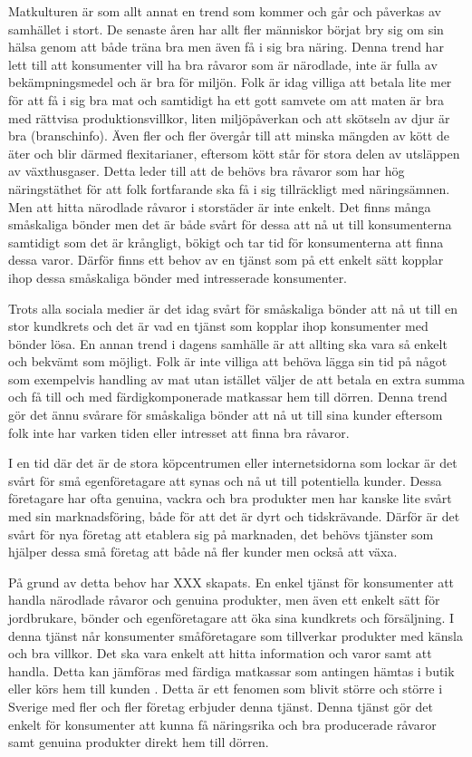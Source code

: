 \documentclass[10pt,a4paper,oneside]{article}
\begin{document}
Matkulturen är som allt annat en trend som kommer och går och påverkas av samhället i stort. De senaste åren har allt fler människor börjat bry sig om sin hälsa genom att både träna bra men även få i sig bra näring. Denna trend har lett till att konsumenter vill ha bra råvaror som är närodlade, inte är fulla av bekämpningsmedel och är bra för miljön. Folk är idag villiga att betala lite mer för att få i sig bra mat och samtidigt ha ett gott samvete om att maten är bra med rättvisa produktionsvillkor, liten miljöpåverkan och att skötseln av djur är bra (branschinfo). Även fler och fler övergår till att minska mängden av kött de äter och blir därmed flexitarianer, eftersom kött står för stora delen av utsläppen av växthusgaser. Detta leder till att de behövs bra råvaror som har hög näringstäthet för att folk fortfarande ska få i sig tillräckligt med näringsämnen. Men att hitta närodlade råvaror i storstäder är inte enkelt. Det finns många småskaliga bönder men det är både svårt för dessa att nå ut till konsumenterna samtidigt som det är krångligt, bökigt och tar tid för konsumenterna att finna dessa varor. Därför finns ett behov av en tjänst som på ett enkelt sätt kopplar ihop dessa småskaliga bönder med intresserade konsumenter.
 
Trots alla sociala medier är det idag svårt för småskaliga bönder att nå ut till en stor kundkrets och det är vad en tjänst som kopplar ihop konsumenter med bönder lösa. En annan trend i dagens samhälle är att allting ska vara så enkelt och bekvämt som möjligt. Folk är inte villiga att behöva lägga sin tid på något som exempelvis handling av mat utan istället väljer de att betala en extra summa och få till och med färdigkomponerade matkassar hem till dörren. Denna trend gör det ännu svårare för småskaliga bönder att nå ut till sina kunder eftersom folk inte har varken tiden eller intresset att finna bra råvaror.

I en tid där det är de stora köpcentrumen eller internetsidorna som lockar är det svårt för små egenföretagare att synas och nå ut till potentiella kunder. Dessa företagare har ofta genuina, vackra och bra produkter men har kanske lite svårt med sin marknadsföring, både för att det är dyrt och tidskrävande. Därför är det svårt för nya företag att etablera sig på marknaden, det behövs tjänster som hjälper dessa små företag att både nå fler kunder men också att växa. 
 
På grund av detta behov har XXX skapats. En enkel tjänst för konsumenter att handla närodlade råvaror och genuina produkter,  men även ett enkelt sätt för jordbrukare, bönder och egenföretagare att öka sina kundkrets och försäljning. I denna tjänst når konsumenter småföretagare som tillverkar produkter med känsla och bra villkor. Det ska vara enkelt att hitta information och varor samt att handla. Detta kan jämföras med färdiga matkassar som antingen hämtas i butik eller körs hem till kunden \cite{ICA2}. Detta är ett fenomen som blivit större och större i Sverige med fler och fler företag erbjuder denna tjänst. Denna tjänst gör det enkelt för konsumenter att kunna få näringsrika och bra producerade råvaror samt genuina produkter direkt hem till dörren. 
\end{document}
